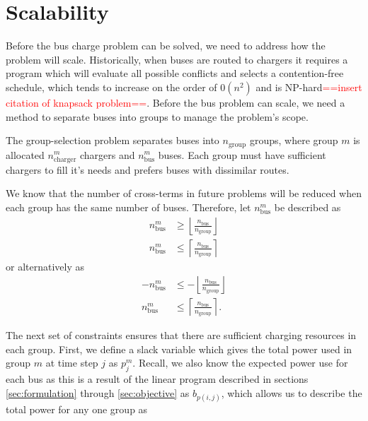 \section{Scalability}
Before the bus charge problem can be solved, we need to address how the problem will scale. Historically, when buses are routed to chargers it requires a program which will evaluate all possible conflicts and selects a contention-free schedule, which tends to increase on the order of $0(n^2)$ and is NP-hard\textcolor{red}{==insert citation of knapsack problem==}. Before the bus problem can scale, we need a method to separate buses into groups to manage the problem's scope.
\par The group-selection problem separates buses into $n_{\text{group}}$ groups, where group $m$ is allocated $n^m_{\text{charger}}$ chargers and $n^m_{\text{bus}}$ buses. Each group must have sufficient chargers to fill it's needs and prefers buses with dissimilar routes. 
\par We know that the number of cross-terms in future problems will be reduced when each group has the same number of buses. Therefore, let $n^m_{\text{bus}}$ be described as
\begin{equation*}\begin{aligned}
	n^m_{\text{bus}} &\ge \left \lfloor \frac{n_{\text{bus}}}{n_{\text{group}}} \right \rfloor \\
	n^m_{\text{bus}} &\le \left \lceil \frac{n_{\text{bus}}}{n_{\text{group}}} \right \rceil
\end{aligned}\end{equation*}
or alternatively as 
\begin{equation}\begin{aligned}
	-n^m_{\text{bus}} &\le -\left \lfloor \frac{n_{\text{bus}}}{n_{\text{group}}} \right \rfloor \\
	n^m_{\text{bus}} &\le \left \lceil \frac{n_{\text{bus}}}{n_{\text{group}}} \right \rceil.
\end{aligned}\end{equation}
\par The next set of constraints ensures that there are sufficient charging resources in each group.  First, we define a slack variable which gives the total power used in group $m$ at time step $j$ as $p_j^m$. Recall, we also know the expected power use for each bus as this is a result of the linear program described in sections \ref{sec:formulation} through \ref{sec:objective} as $b_{p(i,j)}$, which allows us to describe the total power for any one group as
